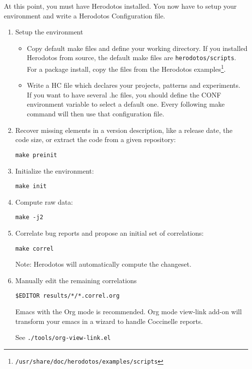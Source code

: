 
\label{chap:howto}

At this point, you must have Herodotos installed. You now have to
setup your environment and write a Herodotos Configuration file.

\begin{enumerate}
\item Setup the environment
  \begin{itemize}
  \item Copy default make files and define your working directory. If
    you installed Herodotos from source, the default make files are
    \texttt{herodotos/scripts}. For a package install, copy the files
    from the Herodotos
    examples\footnote{\texttt{/usr/share/doc/herodotos/examples/scripts}}.
  \item Write a HC file which declares your projects, patterns and experiments.\\
    If you want to have several .hc files, you should define the CONF
    environment variable to select a default one. Every following make
    command will then use that configuration file.
  \end{itemize}

\item Recover missing elements in a version description, like a release
  date, the code size, or extract the code from a given repository:

  \texttt{make preinit}
  
\item Initialize the environment:

  \texttt{make init}
  
\item Compute raw data:

  \texttt{make -j2}

\item Correlate bug reports and propose an initial set of
  correlations:

  \texttt{make correl}

  Note: Herodotos will automatically compute the changeset.

\item Manually edit the remaining correlations

  \texttt{\$EDITOR results/*/*.correl.org}

  Emacs with the Org mode is recommended.
  Org mode view-link add-on will transform your
  emacs in a wizard to handle Coccinelle reports.

  See \texttt{./tools/org-view-link.el}


\end{enumerate}
